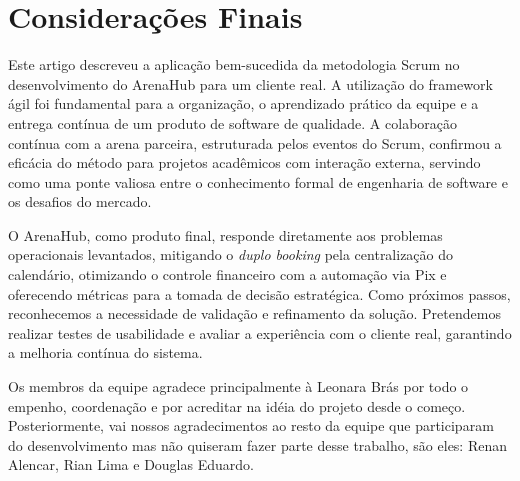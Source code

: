 \documentclass[a4paper, 12pt, twoside]{article}
\begin{document}
\section{Considerações Finais}

Este artigo descreveu a aplicação bem-sucedida da metodologia Scrum no desenvolvimento do ArenaHub para um cliente real. A utilização do framework ágil foi fundamental para a organização, o aprendizado prático da equipe e a entrega contínua de um produto de software de qualidade. A colaboração contínua com a arena parceira, estruturada pelos eventos do Scrum, confirmou a eficácia do método para projetos acadêmicos com interação externa, servindo como uma ponte valiosa entre o conhecimento formal de engenharia de software e os desafios do mercado.

O ArenaHub, como produto final, responde diretamente aos problemas operacionais levantados, mitigando o \textit{duplo booking} pela centralização do calendário, otimizando o controle financeiro com a automação via Pix e oferecendo métricas para a tomada de decisão estratégica. Como próximos passos, reconhecemos a necessidade de validação e refinamento da solução. Pretendemos realizar testes de usabilidade e avaliar a experiência com o cliente real, garantindo a melhoria contínua do sistema.

\printbibliography


Os membros da equipe agradece principalmente à Leonara Brás por todo o empenho, coordenação e por acreditar na idéia do projeto desde o começo. Posteriormente, vai nossos agradecimentos ao resto da equipe que participaram do desenvolvimento mas não quiseram fazer parte desse trabalho, são eles: Renan Alencar, Rian Lima e Douglas Eduardo. 
\end{document}
